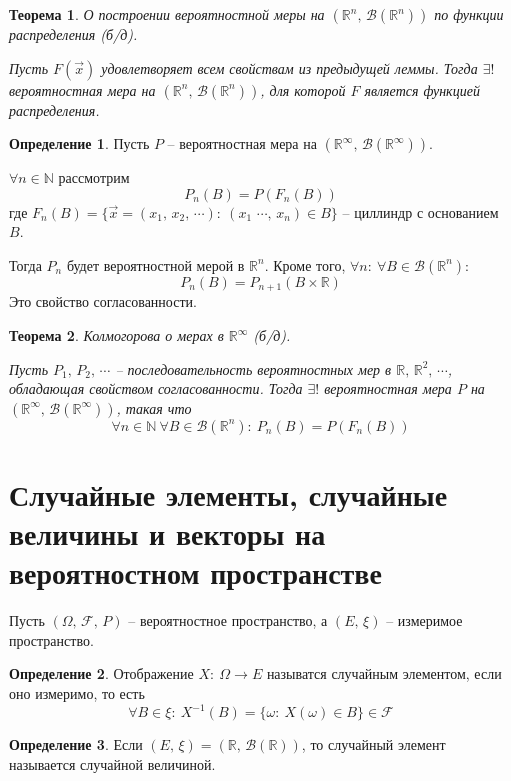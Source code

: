 \documentclass[a4paper,12pt]{article}
\theoremstyle{plain}
\newtheorem{theorem}{Теорема}[section]
\theoremstyle{definition}
\newtheorem{definition}{Определение}[section]
\theoremstyle{remark}
\begin{document}
\begin{theorem}
	О построении вероятностной меры на $(\mathbb{R}^n,\, \mathcal{B}(\mathbb{R}^n))$ по функции распределения (б/д).

	Пусть $F(\vec{x})$ удовлетворяет всем свойствам из предыдущей леммы. Тогда $\exists!$ вероятностная мера на $(\mathbb{R}^n,\, \mathcal{B}(\mathbb{R}^n))$, для которой $F$ является функцией распределения.
\end{theorem}

\begin{definition}
	Пусть $P$ -- вероятностная мера на $(\mathbb{R}^\infty,\, \mathcal{B}(\mathbb{R}^\infty))$.

	$\forall n \in \mathbb{N}$ рассмотрим
	\[P_n(B) = P(F_n(B))\]
	где $F_n(B) = \{\vec{x} = (x_1,\,x_2,\,\cdots) :\: (x_1\,\,\cdots,\,x_n) \in B\}$ -- циллиндр с основанием $B$.

	Тогда $P_n$ будет вероятностной мерой в $\mathbb{R}^n$. Кроме того, $\forall n :\: \forall B \in \mathcal{B}(\mathbb{R}^n)$:
	\[P_n(B) = P_{n + 1}(B \times \mathbb{R})\]
	Это свойство согласованности.
\end{definition}

\begin{theorem}
	Колмогорова о мерах в $\mathbb{R}^\infty$ (б/д).

	Пусть $P_1,\,P_2,\,\cdots$ -- последовательность вероятностных мер в $\mathbb{R},\,\mathbb{R}^2,\,\cdots$, обладающая свойством согласованности.
	Тогда $\exists!$ вероятностная мера $P$ на $(\mathbb{R}^\infty,\,\mathcal{B}(\mathbb{R}^\infty))$, такая что
	\[\forall n \in \mathbb{N} \: \forall B \in \mathcal{B}(\mathbb{R}^n):\: P_n(B) = P(F_n(B))\]
\end{theorem}

\section{Случайные элементы, случайные величины и векторы на вероятностном пространстве}
Пусть $(\Omega,\, \mathcal{F},\, P)$ -- вероятностное пространство, а $(E,\, \xi)$ -- измеримое пространство.

\begin{definition}
	Отображение $X:\: \Omega \to E$ называтся случайным элементом, если оно измеримо, то есть
	\[\forall B \in \xi:\: X^{-1}(B) = \{\omega :\: X(\omega) \in B\} \in \mathcal{F}\]
\end{definition}

\begin{definition}
	Если $(E,\, \xi) = (\mathbb{R},\, \mathcal{B}(\mathbb{R}))$, то случайный элемент называется случайной величиной.
\end{definition}
\end{document}
